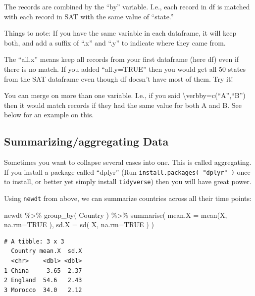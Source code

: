 \documentclass[
  letterpaper,
  DIV=11,
  numbers=noendperiod]{scrreprt}
\newenvironment{Shaded}{\begin{snugshade}}{\end{snugshade}}
\newcommand{\AttributeTok}[1]{\textcolor[rgb]{0.49,0.56,0.16}{#1}}
\newcommand{\ConstantTok}[1]{\textcolor[rgb]{0.53,0.00,0.00}{#1}}
\newcommand{\FunctionTok}[1]{\textcolor[rgb]{0.02,0.16,0.49}{#1}}
\newcommand{\NormalTok}[1]{\textcolor[rgb]{0.00,0.44,0.13}{#1}}
\newcommand{\SpecialCharTok}[1]{\textcolor[rgb]{0.25,0.44,0.63}{#1}}
\begin{document}
The records are combined by the ``by'' variable. I.e., each record in df
is matched with each record in SAT with the same value of ``state.''

Things to note: If you have the same variable in each dataframe, it will
keep both, and add a suffix of ``.x'' and ``.y'' to indicate where they
came from.

The ``all.x'' means keep all records from your first dataframe (here df)
even if there is no match. If you added ``all.y=TRUE'' then you would
get all 50 states from the SAT dataframe even though df doesn't have
most of them. Try it!

You can merge on more than one variable. I.e., if you said
\textbackslash verb\textbar by=c(``A'',``B'')\textbar{} then it would
match records if they had the same value for both A and B. See below for
an example on this.

\hypertarget{summarizingaggregating-data}{%
\subsection{Summarizing/aggregating
Data}\label{summarizingaggregating-data}}

Sometimes you want to collapse several cases into one. This is called
aggregating. If you install a package called ``dplyr'' (Run
\texttt{install.packages(\ "dplyr"\ )} once to install, or better yet
simply install \texttt{tidyverse}) then you will have great power.

Using \texttt{newdt} from above, we can summarize countries across all
their time points:

\begin{Shaded}
\begin{Highlighting}[]
\NormalTok{newdt }\SpecialCharTok{\%\textgreater{}\%} \FunctionTok{group\_by}\NormalTok{( Country ) }\SpecialCharTok{\%\textgreater{}\%} 
    \FunctionTok{summarise}\NormalTok{( }\AttributeTok{mean.X =} \FunctionTok{mean}\NormalTok{(X, }\AttributeTok{na.rm=}\ConstantTok{TRUE}\NormalTok{ ),}
        \AttributeTok{sd.X =} \FunctionTok{sd}\NormalTok{( X, }\AttributeTok{na.rm=}\ConstantTok{TRUE}\NormalTok{ ) )}
\end{Highlighting}
\end{Shaded}

\begin{verbatim}
# A tibble: 3 x 3
  Country mean.X  sd.X
  <chr>    <dbl> <dbl>
1 China     3.65  2.37
2 England  54.6   2.43
3 Morocco  34.0   2.12
\end{verbatim}
\end{document}
